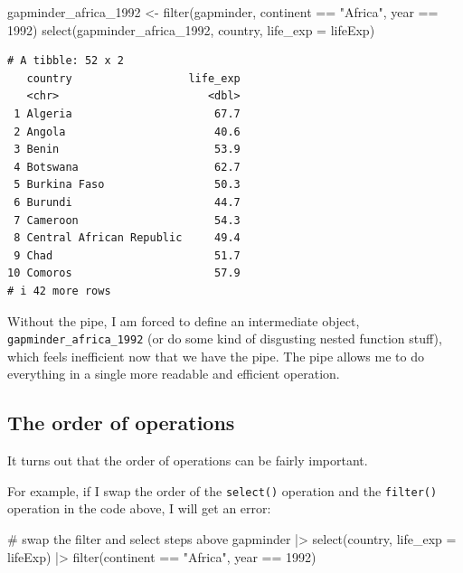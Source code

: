 \documentclass[
  letterpaper,
  DIV=11,
  numbers=noendperiod]{scrreprt}
\newenvironment{Shaded}{\begin{snugshade}}{\end{snugshade}}
\newcommand{\AttributeTok}[1]{\textcolor[rgb]{0.40,0.45,0.13}{#1}}
\newcommand{\CommentTok}[1]{\textcolor[rgb]{0.37,0.37,0.37}{#1}}
\newcommand{\DecValTok}[1]{\textcolor[rgb]{0.68,0.00,0.00}{#1}}
\newcommand{\FunctionTok}[1]{\textcolor[rgb]{0.28,0.35,0.67}{#1}}
\newcommand{\NormalTok}[1]{\textcolor[rgb]{0.00,0.23,0.31}{#1}}
\newcommand{\OtherTok}[1]{\textcolor[rgb]{0.00,0.23,0.31}{#1}}
\newcommand{\SpecialCharTok}[1]{\textcolor[rgb]{0.37,0.37,0.37}{#1}}
\newcommand{\StringTok}[1]{\textcolor[rgb]{0.13,0.47,0.30}{#1}}
\begin{document}
\begin{Shaded}
\begin{Highlighting}[]
\NormalTok{gapminder\_africa\_1992 }\OtherTok{\textless{}{-}} \FunctionTok{filter}\NormalTok{(gapminder, continent }\SpecialCharTok{==} \StringTok{"Africa"}\NormalTok{, year }\SpecialCharTok{==} \DecValTok{1992}\NormalTok{)}
\FunctionTok{select}\NormalTok{(gapminder\_africa\_1992, country, }\AttributeTok{life\_exp =}\NormalTok{ lifeExp)}
\end{Highlighting}
\end{Shaded}

\begin{verbatim}
# A tibble: 52 x 2
   country                  life_exp
   <chr>                       <dbl>
 1 Algeria                      67.7
 2 Angola                       40.6
 3 Benin                        53.9
 4 Botswana                     62.7
 5 Burkina Faso                 50.3
 6 Burundi                      44.7
 7 Cameroon                     54.3
 8 Central African Republic     49.4
 9 Chad                         51.7
10 Comoros                      57.9
# i 42 more rows
\end{verbatim}

Without the pipe, I am forced to define an intermediate object,
\texttt{gapminder\_africa\_1992} (or do some kind of disgusting nested
function stuff), which feels inefficient now that we have the pipe. The
pipe allows me to do everything in a single more readable and efficient
operation.

\subsection{The order of operations}\label{the-order-of-operations}

It turns out that the order of operations can be fairly important.

For example, if I swap the order of the \texttt{select()} operation and
the \texttt{filter()} operation in the code above, I will get an error:

\begin{Shaded}
\begin{Highlighting}[]
\CommentTok{\# swap the filter and select steps above}
\NormalTok{gapminder }\SpecialCharTok{|\textgreater{}} 
  \FunctionTok{select}\NormalTok{(country, }\AttributeTok{life\_exp =}\NormalTok{ lifeExp) }\SpecialCharTok{|\textgreater{}}
  \FunctionTok{filter}\NormalTok{(continent }\SpecialCharTok{==} \StringTok{"Africa"}\NormalTok{, year }\SpecialCharTok{==} \DecValTok{1992}\NormalTok{) }
\end{Highlighting}
\end{Shaded}
\end{document}
